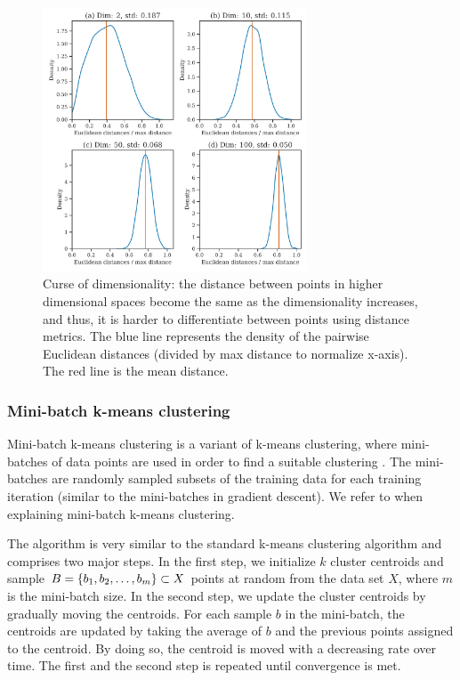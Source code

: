 \begin{figure}[H]
    \centering
    \includegraphics[width=0.7\textwidth]{thesis/figures/curse-of-dimensionality.pdf}
    \caption{Curse of dimensionality: the distance between points in higher dimensional spaces become the same as the dimensionality increases, and thus, it is harder to differentiate between points using distance metrics. The blue line represents the density of the pairwise Euclidean distances (divided by max distance to normalize x-axis). The red line is the mean distance.}
    \label{fig:curse-of-dimensionality}
\end{figure}

\subsubsection{Mini-batch k-means clustering}
\label{sec:mini-batch-k-means-clustering}
Mini-batch k-means clustering is a variant of k-means clustering, where mini-batches of data points are used in order to find a suitable clustering \cite{sculley2010}. The mini-batches are randomly sampled subsets of the training data for each training iteration (similar to the mini-batches in gradient descent). We refer to \cite{sculley2010} when explaining mini-batch k-means clustering.

The algorithm is very similar to the standard k-means clustering algorithm and comprises two major steps. In the first step, we initialize $k$ cluster centroids and sample $B=\left\{b_1, b_2, \ldots, b_m\right\} \subset X$ points at random from the data set $X$, where $m$ is the mini-batch size. In the second step, we update the cluster centroids by gradually moving the centroids. For each sample $b$ in the mini-batch, the centroids are updated by taking the average of $b$ and the previous points assigned to the centroid. By doing so, the centroid is moved with a decreasing rate over time. The first and the second step is repeated until convergence is met.

